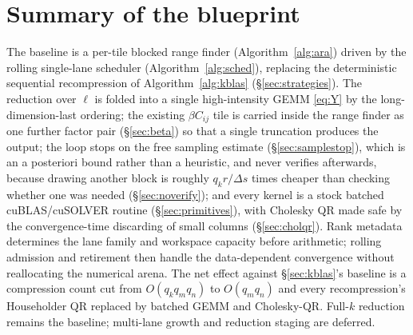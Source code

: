 \documentclass[11pt]{article}
\begin{document}
\section{Summary of the blueprint}
\label{sec:summary}

The baseline is a per-tile blocked range finder (Algorithm~\ref{alg:ara}) driven
by the rolling single-lane scheduler (Algorithm~\ref{alg:sched}), replacing the
deterministic sequential recompression of Algorithm~\ref{alg:kblas}
(\S\ref{sec:strategies}). The
reduction over $\ell$ is folded into a single high-intensity GEMM
\eqref{eq:Y} by the long-dimension-last ordering; the existing $\beta C_{ij}$
tile is carried inside the range finder as one further factor pair
(\S\ref{sec:beta}) so that a single truncation produces the output; the loop
stops on the free sampling estimate (\S\ref{sec:samplestop}), which is an a
posteriori bound rather than a heuristic, and never verifies afterwards, because
drawing another block is roughly $q_kr/\Delta s$ times cheaper than checking
whether one was needed (\S\ref{sec:noverify}); and every kernel is a
stock batched cuBLAS/cuSOLVER routine (\S\ref{sec:primitives}), with Cholesky QR
made safe by the convergence-time discarding of small columns
(\S\ref{sec:cholqr}). Rank metadata determines the lane family and workspace
capacity before arithmetic; rolling admission and retirement then handle the
data-dependent convergence without reallocating the numerical arena. The net
effect against \S\ref{sec:kblas}'s baseline is a compression count cut from
$O(q_kq_mq_n)$ to $O(q_mq_n)$ and every recompression's Householder QR
replaced by batched GEMM and Cholesky-QR. Full-$k$
reduction remains the baseline; multi-lane growth and reduction staging are
deferred.
\end{document}
